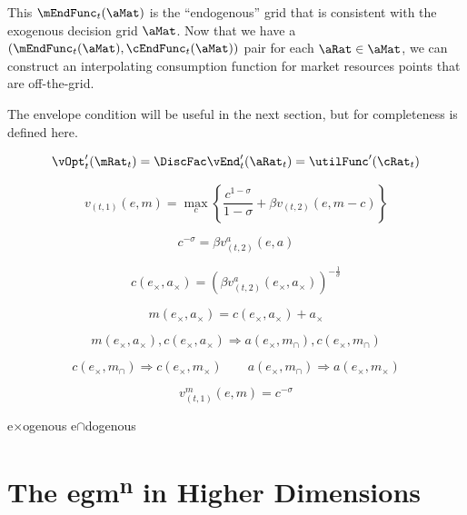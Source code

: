 \documentclass{article}
\begin{document}
This $\mEndFunc_{t}(\aMat)$ is the ``endogenous'' grid that is consistent with the exogenous decision grid $\aMat$. Now that we have a $(\mEndFunc_{t}(\aMat), \cEndFunc_{t}(\aMat))$ pair for each $\aRat \in \aMat$, we can construct an interpolating consumption function for market resources points that are off-the-grid.

The envelope condition will be useful in the next section, but for completeness is defined here.

\begin{equation}
\vOpt_{t}'(\mRat_{t}) = \DiscFac \vEnd_{t}'(\aRat_{t}) = \utilFunc'(\cRat_{t})
\end{equation}

\begin{equation}
v_{(t,1)}(e, m) = \max_{c} \left\{\frac{c^{1-\sigma}}{1-\sigma}  + \beta v_{(t,2)}(e,m - c) \right\}
\end{equation}

\begin{equation}
c^{-\sigma} = \beta v_{(t,2)}^a(e,a) \tag{euler}
\end{equation}

\begin{equation}
c(e_\times,a_\times) = \left(\beta v_{(t,2)}^a(e_\times,a_\times)\right)^{-\frac{1}{\sigma}} \tag{egm}
\end{equation}

\begin{equation}
m(e_\times,a_\times) = c(e_\times,a_\times) + a_\times \tag{budget}
\end{equation}

\begin{equation}
m(e_\times,a_\times), c(e_\times, a_\times) \Rightarrow a(e_\times, m_\cap), c(e_\times,m_\cap) \tag{swap dims}
\end{equation}

\begin{equation}
c(e_\times,m_\cap) \Rightarrow c(e_\times, m_\times) \qquad a(e_\times, m_\cap) \Rightarrow a(e_\times, m_\times) \tag{regrid}
\end{equation}

\begin{equation}
v_{(t,1)}^m(e,m) = c^{-\sigma} \tag{ec}
\end{equation}

e$\times$ogenous e$\cap$dogenous

\section{The \acrshort{egm}\textsuperscript{n} in Higher Dimensions}\label{multdim}
\end{document}
